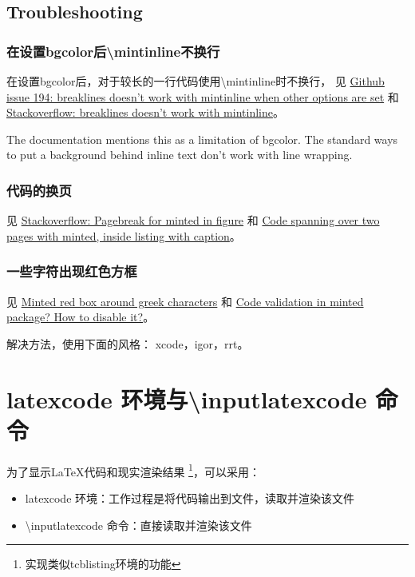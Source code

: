 \subsection{Troubleshooting}

\subsubsection{在设置{\ttfamily bgcolor}后{\ttfamily \textbackslash mintinline}不换行}

在设置{\ttfamily bgcolor}后，对于较长的一行代码使用{\ttfamily \textbackslash mintinline}时不换行，
见
\href{https://github.com/gpoore/minted/issues/194}{Github issue 194: breaklines doesn't work with mintinline when other options are set}
和 
\href{https://tex.stackexchange.com/questions/419934/breaklines-doesnt-work-with-mintinline}{Stackoverflow: breaklines doesn't work with mintinline}。

The documentation mentions this as a limitation of bgcolor. The standard ways to put a background behind inline text don't work with line wrapping.

\subsubsection{代码的换页}

见
\href{https://tex.stackexchange.com/questions/368864/pagebreak-for-minted-in-figure}{Stackoverflow: Pagebreak for minted in figure}
和
\href{https://tex.stackexchange.com/questions/12428/code-spanning-over-two-pages-with-minted-inside-listing-with-caption/53540#53540}{Code spanning over two pages with minted, inside listing with caption}。

\subsubsection{一些字符出现红色方框}

见
\href{https://tex.stackexchange.com/questions/343494/minted-red-box-around-greek-characters}{Minted red box around greek characters}
和 
\href{https://tex.stackexchange.com/questions/424421/code-validation-in-minted-package-how-to-disable-it}{Code validation in minted package? How to disable it?}。

解决方法，使用下面的风格：
xcode，igor，rrt。

\section{{\ttfamily latexcode} 环境与{\ttfamily \textbackslash inputlatexcode} 命令}
为了显示{\LaTeX}代码和现实渲染结果
\footnote{实现类似{\ttfamily tcblisting}环境的功能}，可以采用：
\begin{itemize}
  \item {\ttfamily latexcode} 环境：工作过程是将代码输出到文件，读取并渲染该文件
  \item {\ttfamily \textbackslash inputlatexcode} 命令：直接读取并渲染该文件
\end{itemize}


